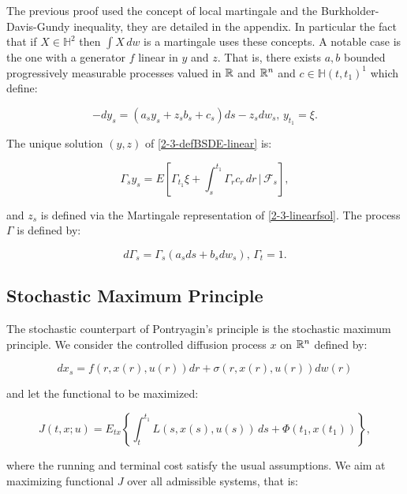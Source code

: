 {\color{red}{}
The previous proof used the concept of local martingale and the Burkholder-Davis-Gundy inequality, they are detailed in the appendix. In particular the fact that if $X\in\mathbb{H}^2$ then $\int X\,dw$ is a martingale uses these concepts.
}
A notable case is the one with a generator $f$ linear in $y$ and $z$. That is, there exists 
$a,b$ bounded progressively measurable processes valued in $\mathbb{R}$ and $\mathbb{R}^n$ and $c\in\mathbb{H}(t,t_1)^1$ which define:

\begin{equation}\label{2-3-defBSDE-linear}-dy_s = \left(a_sy_s + z_sb_s + c_s\right)ds - z_sdw_s,\,y_{t_1}=\xi.\end{equation}

\begin{proposition}
    The unique solution $(y,z)$ of \ref{2-3-defBSDE-linear} is:
    
    \begin{equation}\label{2-3-linearfsol}
        \Gamma_sy_s = E\left[\Gamma_{t_1}\xi + \int_s^{t_1} \Gamma_rc_r\,dr\,|\,\mathcal{F}_s\right],
    \end{equation}

    and $z_s$ is defined via the Martingale representation of \ref{2-3-linearfsol}. The process $\Gamma$ is defined by:

    \[d\Gamma_s = \Gamma_s\left(a_sds + b_sdw_s\right),\,\Gamma_t=1.\]
\end{proposition}

\subsection{Stochastic Maximum Principle}

The stochastic counterpart of Pontryagin's principle is the stochastic maximum principle. We consider the controlled diffusion process $x$ on $\mathbb{R}^n$ defined by:

\begin{equation}
    dx_s = f(r,x(r),u(r))dr + \sigma(r,x(r),u(r))dw(r)
\end{equation}

and let the functional to be maximized:

\begin{equation}\label{2-3-newfunctmax}
    J(t,x;u) = E_{tx}\left\{\int_t^{t_1}L(s,x(s),u(s))\,ds + \Phi(t_1,x(t_1))\right\},
\end{equation}

where the running and terminal cost satisfy the usual assumptions. We aim at maximizing functional $J$ over all 
admissible systems, that is:

